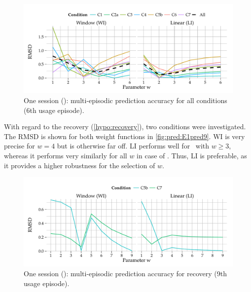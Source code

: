 \begin{figure}[b]
	\centering
\begin{knitrout}
\color{fgcolor}
\includegraphics[width=\maxwidth]{figure/plotE1PRED-1} 

\end{knitrout}
	\caption[One session (): multi-episodic prediction accuracy for the 6th~usage episode]{One session (): multi-episodic prediction accuracy for all conditions (6th usage episode).}
	\label{fig:pred:E1pred6}
\end{figure}

With regard to the recovery (\autoref{hypo:recovery}), two conditions were investigated.
The \ac{RMSD} is shown for both weight functions in \autoref{fig:pred:E1pred9}.
WI is very precise for $\mathit{w}=4$ but is otherwise far off.
LI performs well for~\CVb{} with $\mathit{w} \geq 3$, whereas it performs very similarly for all $\mathit{w}$ in case of .
Thus, LI is preferable, as it provides a higher robustness for the selection of $\mathit{w}$.

\begin{figure}[t]
	\centering
\begin{knitrout}
\color{fgcolor}
\includegraphics[width=\maxwidth]{figure/plotE1PRED9-1} 

\end{knitrout}
	\caption[One session (): multi-episodic prediction accuracy for recovery]{One session (): multi-episodic prediction accuracy for recovery (9th usage episode).}
	\label{fig:pred:E1pred9}
\end{figure}


